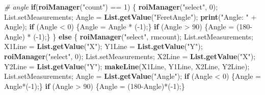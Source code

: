 \documentclass[11pt,singlespacinge,twoside]{reedthesis} %
\newenvironment{Shaded}{}{}
\newcommand{\CommentTok}[1]{\textit{#1}}
\newcommand{\ControlFlowTok}[1]{\textbf{#1}}
\newcommand{\DecValTok}[1]{#1}
\newcommand{\KeywordTok}[1]{\textbf{#1}}
\newcommand{\NormalTok}[1]{#1}
\newcommand{\OperatorTok}[1]{#1}
\newcommand{\StringTok}[1]{#1}
\theoremstyle{definition}
\theoremstyle{definition}
\theoremstyle{definition}
\theoremstyle{remark}
\begin{document}
\begin{Shaded}
\begin{Highlighting}[numbers=left,,]
    \CommentTok{# angle}
        \ControlFlowTok{if}\NormalTok{(}\KeywordTok{roiManager}\NormalTok{(}\StringTok{"count"}\NormalTok{) }\OperatorTok{==}\StringTok{ }\DecValTok{1}\NormalTok{) \{}
            \KeywordTok{roiManager}\NormalTok{(}\StringTok{"select"}\NormalTok{, }\DecValTok{0}\NormalTok{);}
\NormalTok{            List.setMeasurements;}
\NormalTok{            Angle =}\StringTok{ }\KeywordTok{List.getValue}\NormalTok{(}\StringTok{"FeretAngle"}\NormalTok{);}
            \KeywordTok{print}\NormalTok{(}\StringTok{"Angle: "} \OperatorTok{+}\StringTok{ }\NormalTok{Angle);}
            \ControlFlowTok{if}\NormalTok{ (Angle }\OperatorTok{<}\StringTok{ }\DecValTok{0}\NormalTok{) \{Angle =}\StringTok{ }\NormalTok{Angle }\OperatorTok{*}\StringTok{ }\NormalTok{(}\OperatorTok{-}\DecValTok{1}\NormalTok{);\}}
            \ControlFlowTok{if}\NormalTok{ (Angle }\OperatorTok{>}\StringTok{ }\DecValTok{90}\NormalTok{) \{Angle =}\StringTok{ }\NormalTok{(}\DecValTok{180}\OperatorTok{-}\NormalTok{Angle) }\OperatorTok{*}\StringTok{ }\NormalTok{(}\OperatorTok{-}\DecValTok{1}\NormalTok{);\}}
\NormalTok{        \} }\ControlFlowTok{else}\NormalTok{ \{}
            \KeywordTok{roiManager}\NormalTok{(}\StringTok{"select"}\NormalTok{, rmcount);}
\NormalTok{            List.setMeasurements;}
\NormalTok{            X1Line =}\StringTok{ }\KeywordTok{List.getValue}\NormalTok{(}\StringTok{"X"}\NormalTok{);}
\NormalTok{            Y1Line =}\StringTok{ }\KeywordTok{List.getValue}\NormalTok{(}\StringTok{"Y"}\NormalTok{);}
            \KeywordTok{roiManager}\NormalTok{(}\StringTok{"select"}\NormalTok{, }\DecValTok{0}\NormalTok{);}
\NormalTok{            List.setMeasurements;}
\NormalTok{            X2Line =}\StringTok{ }\KeywordTok{List.getValue}\NormalTok{(}\StringTok{"X"}\NormalTok{);}
\NormalTok{            Y2Line =}\StringTok{ }\KeywordTok{List.getValue}\NormalTok{(}\StringTok{"Y"}\NormalTok{);}
            \KeywordTok{makeLine}\NormalTok{(X1Line, Y1Line, X2Line, Y2Line);}
\NormalTok{            List.setMeasurements;}
\NormalTok{            Angle =}\StringTok{ }\KeywordTok{List.getValue}\NormalTok{(}\StringTok{"Angle"}\NormalTok{);}
            \ControlFlowTok{if}\NormalTok{ (Angle }\OperatorTok{<}\StringTok{ }\DecValTok{0}\NormalTok{) \{Angle =}\StringTok{ }\NormalTok{Angle}\OperatorTok{*}\NormalTok{(}\OperatorTok{-}\DecValTok{1}\NormalTok{);\}}
            \ControlFlowTok{if}\NormalTok{ (Angle }\OperatorTok{>}\StringTok{ }\DecValTok{90}\NormalTok{) \{Angle =}\StringTok{ }\NormalTok{(}\DecValTok{180}\OperatorTok{-}\NormalTok{Angle)}\OperatorTok{*}\NormalTok{(}\OperatorTok{-}\DecValTok{1}\NormalTok{);\}}

\end{Highlighting}
\end{Shaded}
\end{document}
